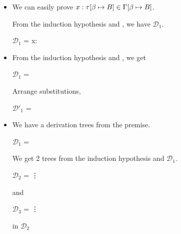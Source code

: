 \begin{itemize}
\begin{itemize}
	      \end{itemize}
	      	      	      
	\item \TVar
	      	      	      
	      We can easily prove $x:\tau[\beta \mapsto B] \in \Gamma[\beta \mapsto B]$.
	      	      	      
	      From the induction hypothesis and \TVar, we have $\mathcal{D}_1$.
	      	      	      
	      $\mathcal{D}_1$ = 
	      {x:\tau\SB \in \GG \andalso {}}
	      	      	      
	\item \TAbs
	      	      	      
	      From the induction hypothesis and \TAbs, we get
	      	      	      
	      $\mathcal{D}_1$ = 
	      { \andalso {}}
	      	      	      
	      Arrange substitutions,
	      	      	      
	      $\mathcal{D}'_1$ = 
	      { \andalso {}}
	      	      	      
	\item \TApp
	      	      	      
	      We have a derivation trees from the premise.
	      	      	      
	      $\mathcal{D}_1$ = 
	      {}
	      	      	      
	      We get 2 trees from the induction hypothesis and $\mathcal{D}_1$.
	      	      	      
	      $\mathcal{D}_2$ = 
	      {\vdots}
	      	      	      
	      and
	      	      	      
	      $\mathcal{D}_3$ = 
	      {\vdots}
	      	      	      
	       in $\mathcal{D}_2$
	      	      	      

\end{itemize}
